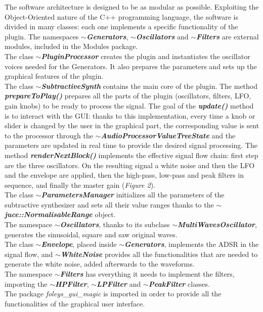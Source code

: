 \documentclass{article}
\begin{document}
The software architecture is designed to be as modular as possible. Exploiting the Object-Oriented nature of the C++ programming language, the software is divided in many classes: each one implements a specific functionality of the plugin. The namespaces \textbf{\textit{$\sim$Generators}}, \textbf{\textit{$\sim$Oscillators}} and \textbf{\textit{$\sim$Filters}} are external modules, included in the Modules package.
\\The class \textbf{\textit{$\sim$PluginProcessor}} creates the plugin and instantiates the oscillator voices needed for the Generators. It also prepares the parameters and sets up the graphical features of the plugin.
\\The class \textbf{\textit{$\sim$SubtractiveSynth}} contains the main core of the plugin. The method \textbf{\textit{prepareToPlay()}} prepares all the parts of the plugin (oscillators, filters, LFO, gain knobs) to be ready to process the signal. The goal of the \textbf{\textit{update()}} method is to interact with the GUI: thanks to this implementation, every time a knob or slider is changed by the user in the graphical part, the corresponding value is sent to the processor through the \textbf{\textit{$\sim$AudioProcessorValueTreeState}} and the parameters are updated in real time to provide the desired signal processing. 
The method \textbf{\textit{renderNextBlock()}} implements the effective signal flow chain: first step are the three oscillators. On the resulting signal a white noise and then the LFO and the envelope are applied, then the high-pass, low-pass and peak filters in sequence, and finally the master gain (\textit{Figure 2}).  
\\The class \textbf{\textit{$\sim$ParametersManager}} initializes all the parameters of the subtractive synthesizer and sets all their value ranges thanks to the \textbf{\textit{$\sim$juce::NormalisableRange}} object.
\\The namespace \textbf{\textit{$\sim$Oscillators}}, thanks to its subclass \textbf{\textit{$\sim$MultiWavesOscillator}}, generates the sinusoidal, square and saw original waves.
\\The class \textbf{\textit{$\sim$Envelope}}, placed inside \textbf{\textit{$\sim$Generators}}, implements the ADSR in the signal flow, and \textbf{\textit{$\sim$WhiteNoise}} provides all the functionalities that are needed to generate the white noise, added afterwards to the waveforms.
\\The namespace \textbf{\textit{$\sim$Filters}} has everything it needs to implement the filters, importing the \textbf{\textit{$\sim$HPFilter}}, \textbf{\textit{$\sim$LPFilter}} and \textbf{\textit{$\sim$PeakFilter}} classes.
\\The package \textit{foleys\_gui\_magic} is imported in order to provide all the functionalities of the graphical user interface.
\end{document}
